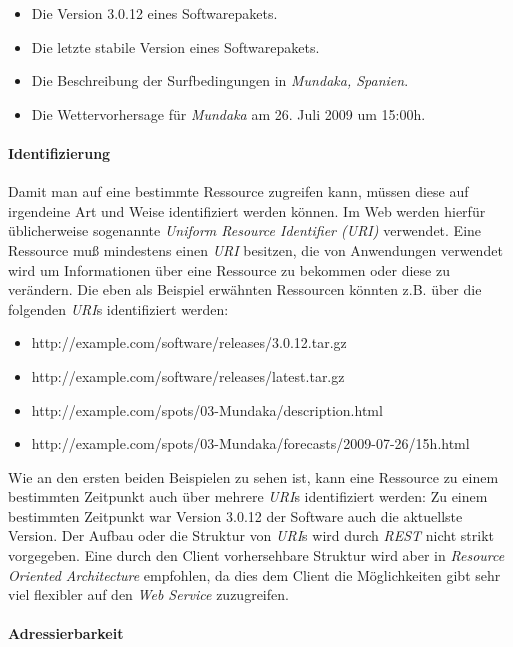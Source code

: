 \begin{itemize}
\item Die Version 3.0.12 eines Softwarepakets.
\item Die letzte stabile Version eines Softwarepakets.
\item Die Beschreibung der Surfbedingungen in \textit{Mundaka,
    Spanien}.
\item Die Wettervorhersage für \textit{Mundaka} am 26. Juli 2009 um 15:00h.
\end{itemize}

\paragraph{Identifizierung}
\label{paragraph:identifizierung}
Damit man auf eine bestimmte Ressource zugreifen kann, müssen diese
auf irgendeine Art und Weise identifiziert werden können. Im Web
werden hierfür üblicherweise sogenannte \textit{Uniform Resource
  Identifier (URI)} 
verwendet. Eine Ressource muß mindestens einen \textit{URI} besitzen,
die von Anwendungen verwendet wird um Informationen über eine
Ressource zu bekommen oder diese zu verändern. Die eben als Beispiel
erwähnten Ressourcen könnten z.B. über die folgenden \textit{URI}s
identifiziert werden:

{\sf \small
  \begin{itemize}
  \item http://example.com/software/releases/3.0.12.tar.gz
  \item http://example.com/software/releases/latest.tar.gz
  \item http://example.com/spots/03-Mundaka/description.html
  \item http://example.com/spots/03-Mundaka/forecasts/2009-07-26/15h.html
  \end{itemize}
}

Wie an den ersten beiden Beispielen zu sehen ist, kann eine Ressource
zu einem bestimmten Zeitpunkt auch über mehrere \textit{URI}s
identifiziert werden: Zu einem bestimmten Zeitpunkt war Version 3.0.12
der Software auch die aktuellste Version. Der Aufbau oder die Struktur
von \textit{URI}s wird durch \textit{REST} nicht strikt vorgegeben.
Eine durch den Client vorhersehbare Struktur wird aber in
\textit{Resource Oriented Architecture} empfohlen, da dies dem Client
die Möglichkeiten gibt sehr viel flexibler auf den \textit{Web Service}
zuzugreifen.

\paragraph{Adressierbarkeit}

